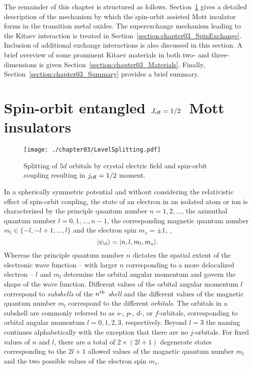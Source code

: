 The remainder of this chapter is structured as follows.
Section~\ref{section:chapter03_CFSO} gives a detailed description of the mechanism by which the spin-orbit assisted Mott insulator forms in the transition metal oxides.
The superexchange mechanism leading to the Kitaev interaction is treated in Section~\ref{section:chapter03_SpinExchange}.
Inclusion of additional exchange interactions is also discussed in this section.
A brief overview of some prominent Kitaev materials in both two- and three-dimensions is given Section~\ref{section:chapter03_Materials}.
Finally, Section~\ref{section:chapter03_Summary} provides a brief summary.


%
%
\section{Spin-orbit entangled \texorpdfstring{$J_{\rm eff} = 1/2$}{Jeff=1/2}~Mott insulators}
\label{section:chapter03_CFSO}
%
%
%
\begin{figure}[tb]
	\centering
	\texttt{[image: ./chapter03/LevelSplitting.pdf]}
	\caption{
		Splitting of $5d$ orbitals by crystal electric field and spin-orbit coupling resulting in $j_{\rm eff} = 1/2$ moment.
	}
	\label{fig:chapter03_LevelSplitting}
\end{figure}
%
In a spherically symmetric potential and without considering the relativistic effect of spin-orbit coupling, the state of an electron in an isolated atom or ion is characterized by the principle quantum number $n = 1, 2, \ldots$, the azimuthal quantum number $l = 0, 1, \ldots, n - 1$, the corresponding magnetic quantum number $m_l \in \{-l, -l+1, \ldots, l\}$ and the electron spin $m_s = \pm 1$, \ie,
%
\begin{equation}
	| \psi_{\rm el} \rangle = | n, l, m_l, m_s \rangle.
\end{equation}
%
Whereas the principle quantum number $n$ dictates the spatial extent of the electronic wave function -- with larger $n$ corresponding to a more delocalized electron -- $l$ and $m_l$ determine the orbital angular momentum and govern the shape of the wave function.
Different values of the orbital angular momentum $l$ correspond to \textit{subshells} of the $n^{\rm th}$ \textit{shell} and the different values of the magnetic quantum number $m_l$ correspond to the different \textit{orbitals}.
The orbitals in a subshell are commonly referred to as $s$-, $p$-, $d$-, or $f$-orbitals, corresponding to orbital angular momentum $l=0, 1, 2, 3$, respectively.
Beyond $l = 3$ the naming continues alphabetically with the exception that there are no $j$-orbitals.
For fixed values of $n$ and $l$, there are a total of $2 \times (2l + 1)$ degenerate states corresponding to the $2l + 1$ allowed values of the magnetic quantum number $m_l$ and the two possible values of the electron spin $m_s$.

